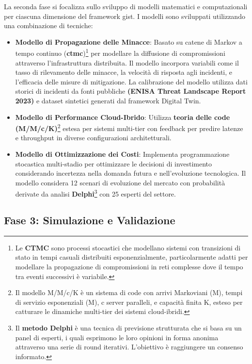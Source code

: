 \label{ssec:fase2}
La seconda fase si focalizza sullo sviluppo di modelli matematici e computazionali per ciascuna dimensione del framework \gls{gist}. I modelli sono sviluppati utilizzando una combinazione di tecniche:
\begin{itemize}
    \item \textbf{Modello di Propagazione delle Minacce}: Basato su catene di Markov a tempo continuo (\textbf{\gls{ctmc}})\footnote{Le \textbf{CTMC} sono processi stocastici che modellano sistemi con transizioni di stato in tempi casuali distribuiti esponenzialmente, particolarmente adatti per modellare la propagazione di compromissioni in reti complesse dove il tempo tra eventi successivi è variabile.} per modellare la diffusione di compromissioni attraverso l'infrastruttura distribuita. Il modello incorpora variabili come il tasso di rilevamento delle minacce, la velocità di risposta agli incidenti, e l'efficacia delle misure di mitigazione. La calibrazione del modello utilizza dati storici di incidenti da fonti pubbliche \textbf{(ENISA Threat Landscape Report 2023)} e dataset sintetici generati dal framework Digital Twin.
\item \textbf{Modello di Performance Cloud-Ibrido}: Utilizza \textbf{teoria delle code (M/M/c/K)}\footnote{Il modello M/M/c/K è un sistema di code con arrivi Markoviani (M), tempi di servizio esponenziali (M), c server paralleli, e capacità finita K, esteso per catturare le dinamiche multi-tier dei sistemi cloud-ibridi.} estesa per sistemi multi-tier con feedback per predire latenze e throughput in diverse configurazioni architetturali. 
\item \textbf{Modello di Ottimizzazione dei Costi}: Implementa programmazione stocastica multi-stadio per ottimizzare le decisioni di investimento considerando incertezza nella domanda futura e nell'evoluzione tecnologica. Il modello considera 12 scenari di evoluzione del mercato con probabilità derivate da analisi \textbf{Delphi}\footnote{Il \textbf{metodo Delphi} è una tecnica di previsione strutturata che si basa su un panel di esperti, i quali esprimono le loro opinioni in forma anonima attraverso una serie di round iterativi. L'obiettivo è raggiungere un consenso informato.} con 25 esperti del settore.

\end{itemize}

\subsection{\texorpdfstring{\textbf{Fase 3: Simulazione e Validazione}}{1.5.4 - Fase 3: Simulazione e Validazione}}

